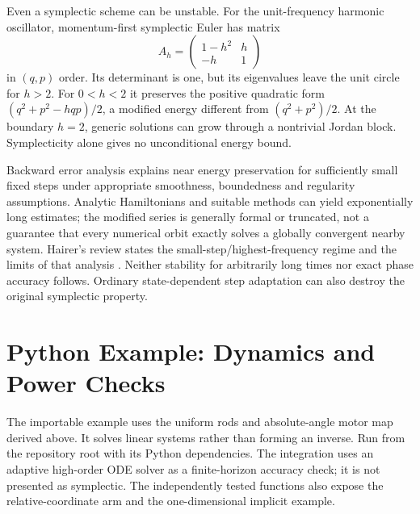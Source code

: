 Even a symplectic scheme can be unstable. For the unit-frequency harmonic oscillator, momentum-first symplectic Euler has matrix
\begin{equation}
A_h=\begin{pmatrix}1-h^2&h\\-h&1\end{pmatrix}
\label{eq:lagrangian_oscillator_step}
\end{equation}
in $(q,p)$ order. Its determinant is one, but its eigenvalues leave the unit circle for $h>2$. For $0<h<2$ it preserves the positive quadratic form $(q^2+p^2-hqp)/2$, a modified energy different from $(q^2+p^2)/2$. At the boundary $h=2$, generic solutions can grow through a nontrivial Jordan block. Symplecticity alone gives no unconditional energy bound.

Backward error analysis explains near energy preservation for sufficiently small fixed steps under appropriate smoothness, boundedness and regularity assumptions. Analytic Hamiltonians and suitable methods can yield exponentially long estimates; the modified series is generally formal or truncated, not a guarantee that every numerical orbit exactly solves a globally convergent nearby system. Hairer's review states the small-step/highest-frequency regime and the limits of that analysis \cite{HairerChallengesSupplement}. Neither stability for arbitrarily long times nor exact phase accuracy follows. Ordinary state-dependent step adaptation can also destroy the original symplectic property.

\section{Python Example: Dynamics and Power Checks}
\label{sec:lagrangian_python}

The importable example uses the uniform rods and absolute-angle motor map derived above. It solves linear systems rather than forming an inverse. Run from the repository root with its Python dependencies. The integration uses an adaptive high-order ODE solver as a finite-horizon accuracy check; it is not presented as symplectic. The independently tested functions also expose the relative-coordinate arm and the one-dimensional implicit example.


